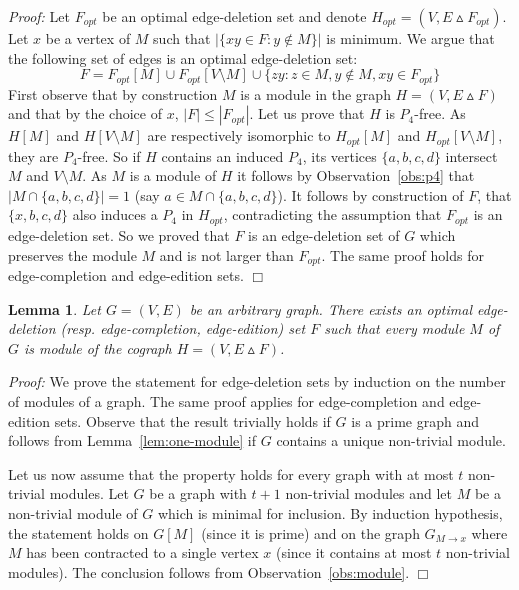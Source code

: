\documentclass[11pt]{article}
\newenvironment{proof}{\noindent\textit{Proof: }}{{\hfill $\Box$}}
\newtheorem{lemma}{Lemma}[section]
\begin{document}
\begin{proof}
Let $F_{opt}$ be an optimal edge-deletion set  and denote $H_{opt}=(V,E\vartriangle F_{opt})$. Let $x$ be a vertex of $M$ such that $|\{xy\in F:y\notin M\}|$ is minimum.
We argue that the following set of edges is an optimal edge-deletion set:
$$F=F_{opt}[M]\cup F_{opt}[V\setminus M]\cup \{zy: z\in M,y\notin M,xy\in F_{opt}\}$$
First observe that by construction $M$ is a module in the graph $H=(V,E\vartriangle F)$ and that by the choice of $x$, $|F|\leqslant |F_{opt}|$. Let us prove that $H$ is $P_4$-free. As $H[M]$ and $H[V\setminus M]$ are respectively isomorphic to $H_{opt}[M]$ and $H_{opt}[V\setminus M]$, they are $P_4$-free. So if $H$ contains an induced $P_4$, its vertices $\{a,b,c,d\}$ intersect $M$ and $V\setminus M$. As $M$ is a module of $H$ it follows by Observation~\ref{obs:p4} that $|M\cap\{a,b,c,d\}|=1$ (say $a\in M\cap\{a,b,c,d\}$). It follows by construction of $F$, that $\{x,b,c,d\}$ also induces a $P_4$ in $H_{opt}$, contradicting the assumption that $F_{opt}$ is an edge-deletion set. So we proved that $F$ is an edge-deletion set of $G$ which preserves the module $M$ and is not larger than $F_{opt}$. 
The same proof holds for edge-completion and edge-edition sets.
\end{proof}

\begin{lemma}
\label{lem:modules}
Let $G=(V,E)$ be an arbitrary graph. There exists an optimal edge-deletion (resp. edge-completion, edge-edition) set $F$ such that every module $M$ of $G$ is module of the cograph $H=(V,E\vartriangle F)$.
\end{lemma}

\begin{proof}
We prove the statement for edge-deletion sets by induction on the number of modules of a graph. The same proof applies for edge-completion and edge-edition sets. Observe that the result trivially holds if $G$ is a prime graph and follows from Lemma~\ref{lem:one-module} if $G$ contains a unique non-trivial module.  

Let us now assume that the property holds for every graph with at most $t$ non-trivial modules. Let $G$ be a graph with $t+1$ non-trivial modules and let $M$ be a non-trivial module of $G$ which is minimal for inclusion. By induction hypothesis, the statement holds on $G[M]$ (since it is prime) and on the graph $G_{M\rightarrow x}$ where $M$ has been contracted to a single vertex $x$ (since it contains at most $t$ non-trivial modules). The conclusion follows from Observation~\ref{obs:module}.
 \end{proof}\\
\end{document}
